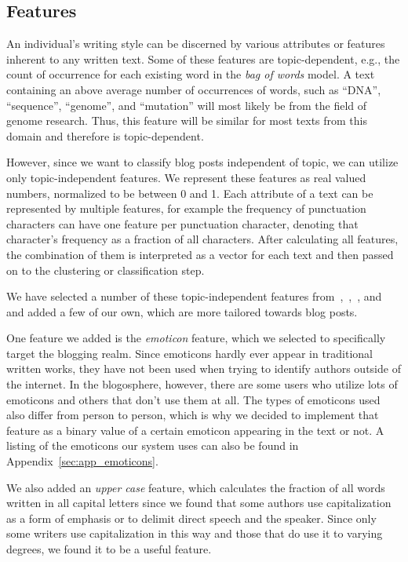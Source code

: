 \subsection{Features}
\label{sec:features}

An individual's writing style can be discerned by various attributes or features inherent to any written text.
Some of these features are topic-dependent, e.g., the count of occurrence for each existing word in the \textit{bag of words} model.
A text containing an above average number of occurrences of words, such as ``DNA'', ``sequence'', ``genome'', and ``mutation'' will most likely be from the field of genome research.
Thus, this feature will be similar for most texts from this domain and therefore is topic-dependent.


However, since we want to classify blog posts independent of topic, we can utilize only topic-independent features.
We represent these features as real valued numbers, normalized to be between 0  and 1.
Each attribute of a text can be represented by multiple features, for example the frequency of punctuation characters can have one feature per punctuation character, denoting that character's frequency as a fraction of all characters.
After calculating all features, the combination of them is interpreted as a vector for each text and then passed on to the clustering or classification step.


We have selected a number of these topic-independent features from~\cite{madigan2005author},~\cite{de2001mining},~\cite{argamon2003style}, and~\cite{narayanan2012feasibility} and added a few of our own, which are more tailored towards blog posts.


One feature we added is the \textit{emoticon} feature, which we selected to specifically target the blogging realm.
Since emoticons hardly ever appear in traditional written works, they have not been used when trying to identify authors outside of the internet.
In the blogosphere, however, there are some users who utilize lots of emoticons and others that don't use them at all.
The types of emoticons used also differ from person to person, which is why we decided to implement that feature as a binary value of a certain emoticon appearing in the text or not.
A listing of the emoticons our system uses can also be found in Appendix~\ref{sec:app_emoticons}.


We also added an \textit{upper case} feature, which calculates the fraction of all words written in all capital letters since we found that some authors use capitalization as a form of emphasis or to delimit direct speech and the speaker.
Since only some writers use capitalization in this way and those that do use it to varying degrees, we found it to be a useful feature.


